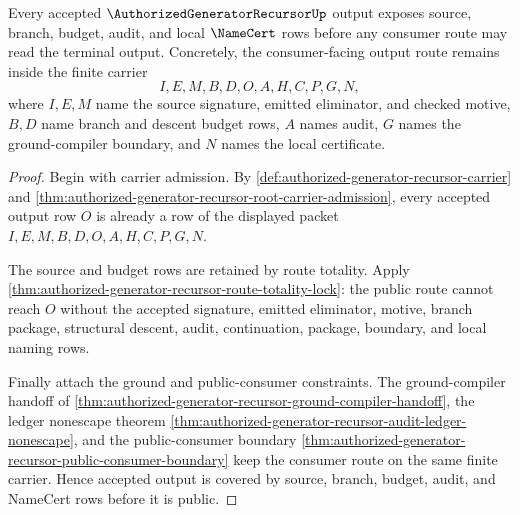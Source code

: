 \begin{theorem}
\label{thm:authorized-generator-recursor-acceptance-budget-cover}
Every accepted $\AuthorizedGeneratorRecursorUp$ output exposes source, branch, budget, audit, and local $\NameCert$ rows before any consumer route may read the terminal output. Concretely, the consumer-facing output route remains inside the finite carrier
$$
I,E,M,B,D,O,A,H,C,P,G,N,
$$
where $I,E,M$ name the source signature, emitted eliminator, and checked motive, $B,D$ name branch and descent budget rows, $A$ names audit, $G$ names the ground-compiler boundary, and $N$ names the local certificate.
\end{theorem}
\begin{proof}
Begin with carrier admission. By \autoref{def:authorized-generator-recursor-carrier} and \autoref{thm:authorized-generator-recursor-root-carrier-admission}, every accepted output row $O$ is already a row of the displayed packet $I,E,M,B,D,O,A,H,C,P,G,N$.

The source and budget rows are retained by route totality. Apply \autoref{thm:authorized-generator-recursor-route-totality-lock}: the public route cannot reach $O$ without the accepted signature, emitted eliminator, motive, branch package, structural descent, audit, continuation, package, boundary, and local naming rows.

Finally attach the ground and public-consumer constraints. The ground-compiler handoff of \autoref{thm:authorized-generator-recursor-ground-compiler-handoff}, the ledger nonescape theorem \autoref{thm:authorized-generator-recursor-audit-ledger-nonescape}, and the public-consumer boundary \autoref{thm:authorized-generator-recursor-public-consumer-boundary} keep the consumer route on the same finite carrier. Hence accepted output is covered by source, branch, budget, audit, and NameCert rows before it is public.
\end{proof}

